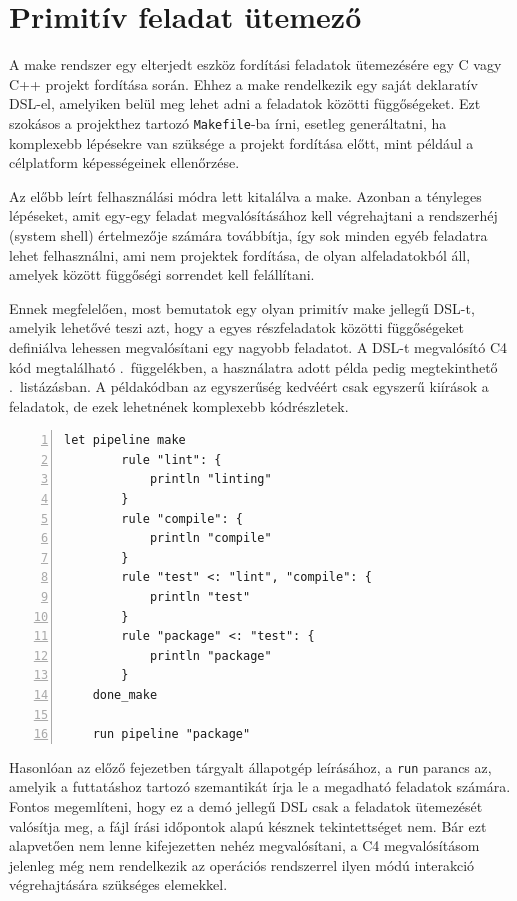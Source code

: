 \section{Primitív feladat ütemező}\label{sec:uses:make}

A make rendszer egy elterjedt eszköz fordítási feladatok ütemezésére egy C vagy C++ projekt fordítása során.
Ehhez a make rendelkezik egy saját deklaratív \gls{DSL}-el, amelyiken belül meg lehet adni a feladatok közötti függőségeket.
Ezt szokásos a projekthez tartozó {\tt Makefile}-ba írni, esetleg generáltatni, ha komplexebb lépésekre van szüksége a projekt fordítása előtt, mint például a célplatform képességeinek ellenőrzése.

Az előbb leírt felhasználási módra lett kitalálva a make.
Azonban a tényleges lépéseket, amit egy-egy feladat megvalósításához kell végrehajtani a rendszerhéj (system shell) értelmezője számára továbbítja, így sok minden egyéb feladatra lehet felhasználni, ami nem projektek fordítása, de olyan alfeladatokból áll, amelyek között függőségi sorrendet kell felállítani.

Ennek megfelelően, most bemutatok egy olyan primitív make jellegű \gls{DSL}-t, amelyik lehetővé teszi azt, hogy a egyes részfeladatok közötti függőségeket definiálva lehessen megvalósítani egy nagyobb feladatot.
A \gls{DSL}-t megvalósító C4 kód megtalálható .~függelékben, a használatra adott példa pedig megtekinthető .~listázásban.
A példakódban az egyszerűség kedvéért csak egyszerű kiírások a feladatok, de ezek lehetnének komplexebb kódrészletek.

\begin{lstlisting}[gobble=4,numbers=left,caption={C4 make jellegű \gls{DSL} használati példa},label=lst:ex-make]
    let pipeline make
        rule "lint": {
            println "linting"
        }
        rule "compile": {
            println "compile"
        }
        rule "test" <: "lint", "compile": {
            println "test"
        }
        rule "package" <: "test": {
            println "package"
        }
    done_make

    run pipeline "package"
\end{lstlisting}

Hasonlóan az előző fejezetben tárgyalt állapotgép leírásához, a {\tt run} parancs az, amelyik a futtatáshoz tartozó szemantikát írja le a megadható feladatok számára.
Fontos megemlíteni, hogy ez a demó jellegű \gls{DSL} csak a feladatok ütemezését valósítja meg, a fájl írási időpontok alapú késznek tekintettséget nem.
Bár ezt alapvetően nem lenne kifejezetten nehéz megvalósítani, a C4 megvalósításom jelenleg még nem rendelkezik az operációs rendszerrel ilyen módú interakció végrehajtására szükséges elemekkel.





